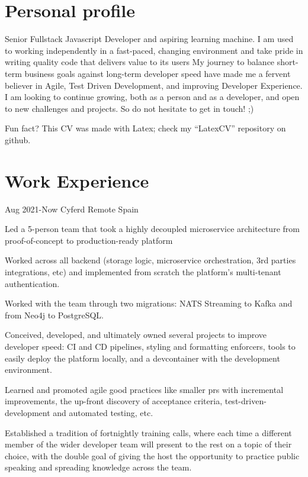 \documentclass[10pt]{CurriculumVitae}
\begin{document}
  \makeheading

  \section{Personal profile}
    {
      Senior Fullstack Javascript Developer and aspiring learning machine.
      I am used to working independently in a fast-paced, changing environment and take pride in writing quality code that delivers value to its users
      My journey to balance short-term business goals against long-term developer speed have made me a fervent believer in Agile, Test Driven Development, and improving Developer Experience.
      I am looking to continue growing, both as a person and as a developer, and open to new challenges and projects. So do not hesitate to get in touch! ;) 
      
      \null\hfill {\scriptsize Fun fact? This CV was made with Latex; check my ``LatexCV'' repository on github.}
    }


  \section{Work Experience}

      {Aug 2021-Now}
      {Cyferd}
      {Remote}
      {Spain}
      {
        \item Led a 5-person team that took a highly decoupled microservice architecture from proof-of-concept to production-ready platform
        \item Worked across all backend (storage logic, microservice orchestration, 3rd parties integrations, etc) and implemented from scratch the platform's multi-tenant authentication.
        \item Worked with the team through two migrations: NATS Streaming to Kafka and from Neo4j to PostgreSQL.
        \item Conceived, developed, and ultimately owned several projects to improve developer speed: CI and CD pipelines, styling and formatting enforcers, tools to easily deploy the platform locally, and a devcontainer with the development environment.
        \item Learned and promoted agile good practices like smaller prs with incremental improvements, the up-front discovery of acceptance criteria, test-driven-development and automated testing, etc.
        \item Established a tradition of fortnightly training calls, where each time a different member of the wider developer team will present to the rest on a topic of their choice, with the double goal of giving the host the opportunity to practice public speaking and spreading knowledge across the team.
      }
\end{document}
